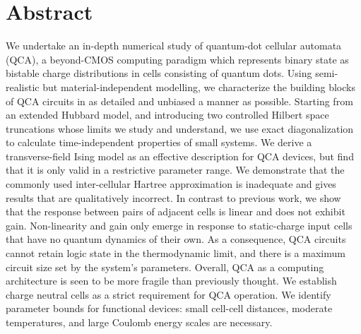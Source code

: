 \chapter*{Abstract}

\begin{doublespace}
We undertake an in-depth numerical study of quantum-dot cellular automata (QCA),
a beyond-CMOS computing paradigm which represents binary state as bistable
charge distributions in cells consisting of quantum dots. Using semi-realistic
but material-independent modelling, we characterize the building blocks of QCA
circuits in as detailed and unbiased a manner as possible. Starting from an
extended Hubbard model, and introducing two controlled Hilbert space truncations
whose limits we study and understand, we use exact diagonalization to calculate
time-independent properties of small systems. We derive a transverse-field Ising
model as an effective description for QCA devices, but find that it is only
valid in a restrictive parameter range. We demonstrate that the commonly used
inter-cellular Hartree approximation is inadequate and gives results that are
qualitatively incorrect.  In contrast to previous work, we show that the
response between pairs of adjacent cells is linear and does not exhibit gain.
Non-linearity and gain only emerge in response to static-charge input cells that
have no quantum dynamics of their own. As a consequence, QCA circuits cannot
retain logic state in the thermodynamic limit, and there is a maximum circuit
size set by the system's parameters. Overall, QCA as a computing architecture is
seen to be more fragile than previously thought. We establish charge neutral
cells as a strict requirement for QCA operation. We identify parameter bounds
for functional devices: small cell-cell distances, moderate temperatures, and
large Coulomb energy scales are necessary.
\end{doublespace}
